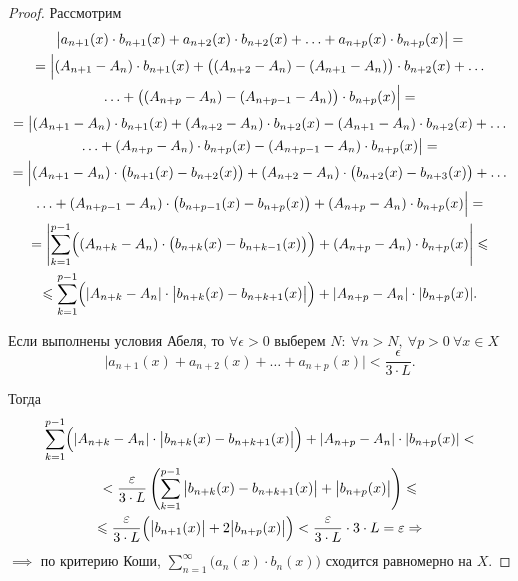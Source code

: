 \begin{proof}
    Рассмотрим
    \begin{multline*}
        \big|a_{n+1}(x)\cdot b_{n+1}(x) + a_{n+2}(x)\cdot b_{n+2}(x) + \ldots + a_{n+p}(x)\cdot b_{n+p}(x)\big| = \\
        = \Big|(A_{n+1} - A_n)\cdot b_{n+1}(x) + \big((A_{n+2} - A_n) - (A_{n+1} - A_n)\big)\cdot b_{n+2}(x) + \ldots \\
        \ldots + \big((A_{n+p} -A_n) - (A_{n+p-1} - A_n)\big)\cdot b_{n+p}(x)\Big| = \\
        = \big|(A_{n+1} - A_n)\cdot b_{n+1}(x) + (A_{n+2} - A_n)\cdot b_{n+2}(x) - (A_{n+1} - A_n)\cdot b_{n+2}(x) + \ldots \\
        \ldots + (A_{n+p} -A_n)\cdot b_{n+p}(x) - (A_{n+p-1} - A_n)\cdot b_{n+p}(x)\big| = \\
        = \Big|(A_{n+1}-A_n)\cdot\big(b_{n+1}(x)-b_{n+2}(x)\big) + (A_{n+2}-A_n)\cdot\big(b_{n+2}(x)-b_{n+3}(x)\big) + \ldots \\
        \ldots + (A_{n+p-1}-A_n)\cdot\big(b_{n+p-1}(x)-b_{n+p}(x)\big) + (A_{n+p} - A_n)\cdot b_{n+p}(x)\Big| = \\
        = \left|\sum_{k=1}^{p-1}\Bigl((A_{n+k} - A_n)\cdot\big(b_{n+k}(x) - b_{n+k-1}(x)\big)\Bigr) + (A_{n+p} - A_n)\cdot b_{n+p}(x) \right| \leqslant \\
        \leqslant \sum_{k=1}^{p-1}\Bigl(|A_{n+k} - A_n| \cdot \big|b_{n+k}(x) - b_{n+k+1}(x)\big|\Bigr) + | A_{n+p} - A_n | \cdot | b_{n+p}(x) |.
    \end{multline*}

    Если выполнены условия Абеля, то $ \forall \epsilon > 0 $ выберем $ N: \ \forall n > N, \ \forall p > 0 \ \forall x \in X $
    \[
        \big|a_{n+1}(x) + a_{n+2}(x) + \ldots + a_{n+p}(x)\big| < \frac{\epsilon}{3\cdot L}.
    \]

    Тогда
    \begin{multline*}
        \sum_{k=1}^{p-1}\Bigl(|A_{n+k} - A_n| \cdot \big|b_{n+k}(x) - b_{n+k+1}(x)\big|\Bigr) + | A_{n+p} - A_n | \cdot | b_{n+p}(x) | < \\
        < \frac{\epsilon}{3\cdot L}\left(\sum_{k=1}^{p-1}\big|b_{n+k}(x) - b_{n+k+1}(x)\big| + \big|b_{n+p}(x)\big|\right) \leqslant \\
        \leqslant \frac{\epsilon}{3\cdot L}\Bigl(\big|b_{n+1}(x)\big| + 2\big|b_{n+p}(x)\big|\Bigr) < \frac{\epsilon}{3\cdot L} \cdot 3\cdot L = \epsilon \implies
    \end{multline*}
    $ \implies $ по критерию Коши, $ \sum_{n=1}^{\infty}\big(a_n(x)\cdot b_n(x)\big) $ сходится равномерно на $ X $.


\end{proof}
